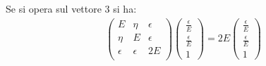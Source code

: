 Se si opera sul vettore $3$ si ha:
\begin{equation}\begin{split}
\left(\begin{matrix}
E&\eta&\epsilon\\
\eta&E&\epsilon\\
\epsilon&\epsilon&2E\\
\end{matrix}\right)\left(\begin{matrix}
\frac{\epsilon}{E}\\
\frac{\epsilon}{E}\\
1
\end{matrix}\right)=2E\left(\begin{matrix}
\frac{\epsilon}{E}\\
\frac{\epsilon}{E}\\
1
\end{matrix}\right)
\end{split}\end{equation}